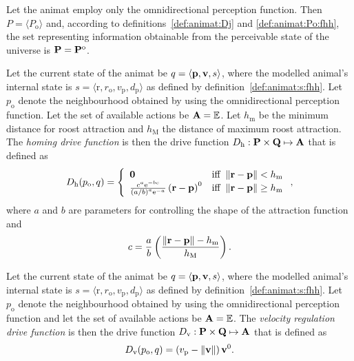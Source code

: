 Let the animat employ only the omnidirectional perception function. Then $P=\langle P_\mathrm{o} \rangle$ and, according to definitions~\ref{def:animat:Dj} and \ref{def:animat:Po:fhh}, the set representing information obtainable from the perceivable state of the universe is ${\mathbf{P}}={\mathbf{P}}^\mathrm{o}$.

\begin{defn}
\label{def:animat:Dh:fhh}
Let the current state of the animat be $q=\langle{\ensuremath{\mathbf{p}}},{\mathbf{v}},s\rangle$, where the modelled animal's internal state is $s=\langle\mathrm{r},r_\mathrm{o},v_\mathrm{p},d_\mathrm{p}\rangle$ as defined by definition~\ref{def:animat:s:fhh}. Let $p_\mathrm{o}$ denote the neighbourhood obtained by using the omnidirectional perception function. Let the set of available actions be ${\mathbf{A}}=\mathbb{E}$. Let $h_\mathrm{m}$ be the minimum distance for roost attraction and $h_\mathrm{M}$ the distance of maximum roost attraction. The \emph{homing drive function} is then the drive function $D_\mathrm{h}: {\mathbf{P}} \times {\ensuremath{\mathbf{Q}}} \mapsto {\ensuremath{\mathbf{A}}}$ that is defined as 
\begin{equation}
D_\mathrm{h}(p_\mathrm{o}, q) = \left\{
\begin{array}{ll}
\vect{0} & \mathrm{iff}\ \left\|\vect{r}-\vect{p}\right\| < h_\mathrm{m} \\
\frac{c^a \mathrm{e}^{-bc}}{\left(a/b\right)^a \mathrm{e}^{-a}} \left(\vect{r}-\vect{p}\right)^0  & \mathrm{iff}\ \left\|\vect{r}-\vect{p}\right\| \geq h_\mathrm{m}
\end{array}
\right., \label{eq:animat:Dr:fhh}
\end{equation}
where $a$ and $b$ are parameters for controlling the shape of the attraction function and 
\begin{equation}
c=\frac{a}{b}\left(\frac{\left\|{\mathbf{r}}-{\mathbf{p}}\right\|-h_\mathrm{m}}{h_\mathrm{M}}\right).
\end{equation}
\end{defn}

\begin{defn}
\label{def:animat:Dv:cwr}
Let the current state of the animat be $q=\langle{\ensuremath{\mathbf{p}}},{\mathbf{v}},s\rangle$, where the modelled animal's internal state is $s=\langle\mathrm{r},r_\mathrm{o},v_\mathrm{p},d_\mathrm{p}\rangle$ as defined by definition~\ref{def:animat:s:fhh}. Let $p_\mathrm{o}$ denote the neighbourhood obtained by using the omnidirectional perception function and let the set of available actions be ${\mathbf{A}}=\mathbb{E}$. The \emph{velocity regulation drive function} is then the drive function $D_\mathrm{v}: {\mathbf{P}} \times {\ensuremath{\mathbf{Q}}} \mapsto {\ensuremath{\mathbf{A}}}$ that is defined as 
\begin{equation}
D_\mathrm{v}(p_\mathrm{o}, q) = \left(v_\mathrm{p}-\left\|{\mathbf{v}}\right\|\right){\mathbf{v}}^0. \label{eq:animat:Dv:fhh}
\end{equation}
\end{defn}

